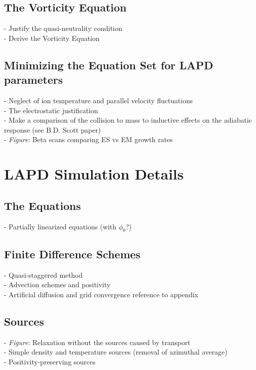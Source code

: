 \documentclass[12pt]{article}
\begin{document}
\subsection{The Vorticity Equation}

- Justify the quasi-neutrality condition \\
- Derive the Vorticity Equation \\

\subsection{Minimizing the Equation Set for LAPD parameters}

- Neglect of ion temperature and parallel velocity fluctuations \\
- The electrostatic justification \\
- Make a comparison of the collision to mass to inductive effects on the adiabatic response (see B.D. Scott paper) \\
- \emph{Figure}: Beta scans comparing ES vs EM growth rates \\


\section{LAPD Simulation Details}

\subsection{The Equations}

- Partially linearized equations (with $\phi_0$?) \\

\subsection{Finite Difference Schemes}

- Quasi-staggered method \\
- Advection schemes and positivity \\
- Artificial diffusion and grid convergence reference to appendix \\

\subsection{Sources}

- \emph{Figure}: Relaxation without the sources caused by transport \\
- Simple density and temperature sources (removal of azimuthal average) \\
- Positivity-preserving sources \\
\end{document}
